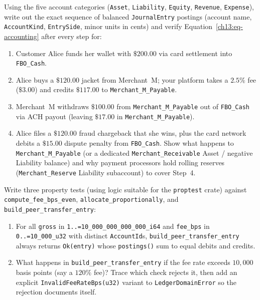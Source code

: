 \begin{exercise}
Using the five account categories (\texttt{Asset}, \texttt{Liability}, \texttt{Equity}, \texttt{Revenue}, \texttt{Expense}), write out the exact sequence of balanced \texttt{JournalEntry} postings (account name, \texttt{AccountKind}, \texttt{EntrySide}, minor units in cents) and verify Equation~\eqref{ch13:eq-accounting} after every step for:
\begin{enumerate}
  \item Customer Alice funds her wallet with $\$200.00$ via card settlement into \texttt{FBO\_Cash}.
  \item Alice buys a $\$120.00$ jacket from Merchant~M; your platform takes a $2.5\%$ fee ($\$3.00$) and credits $\$117.00$ to \texttt{Merchant\_M\_Payable}.
  \item Merchant~M withdraws $\$100.00$ from \texttt{Merchant\_M\_Payable} out of \texttt{FBO\_Cash} via ACH payout (leaving $\$17.00$ in \texttt{Merchant\_M\_Payable}).
  \item Alice files a $\$120.00$ fraud chargeback that she wins, plus the card network debits a $\$15.00$ dispute penalty from \texttt{FBO\_Cash}. Show what happens to \texttt{Merchant\_M\_Payable} (or a dedicated \texttt{Merchant\_Receivable} Asset / negative Liability balance) and why payment processors hold rolling reserves (\texttt{Merchant\_Reserve} Liability subaccount) to cover Step~4.
\end{enumerate}
\end{exercise}

\begin{exercise}
Write three property tests (using logic suitable for the \texttt{proptest} crate) against \texttt{compute\_fee\_bps\_even}, \texttt{allocate\_proportionally}, and \texttt{build\_peer\_transfer\_entry}:
\begin{enumerate}
  \item For all \texttt{gross} in \texttt{1..=10\_000\_000\_000\_000\_i64} and \texttt{fee\_bps} in \texttt{0..=10\_000\_u32} with distinct \texttt{AccountId}s, \texttt{build\_peer\_transfer\_entry} always returns \texttt{Ok(entry)} whose \texttt{postings()} sum to equal debits and credits.
  \item What happens in \texttt{build\_peer\_transfer\_entry} if the fee rate exceeds $10{,}000$ basis points (say a $120\%$ fee)? Trace which check rejects it, then add an explicit \texttt{InvalidFeeRateBps(u32)} variant to \texttt{LedgerDomainError} so the rejection documents itself.
\end{enumerate}
\end{exercise}

